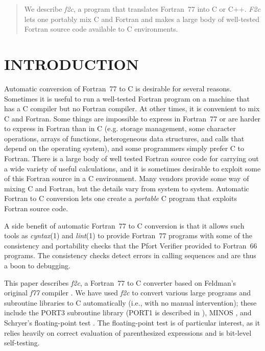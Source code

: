 \documentclass[10pt,a4paper]{article}
\begin{document}
\begin{abstract}
\noindent
We describe \emph{f2c}, a program that translates Fortran~77 into C or C++. \emph{F2c} lets one portably mix C and Fortran and makes a large body of well-tested Fortran source code available to C environments.
\end{abstract}

\nocite{1,2,3,4,5,6,7,8,9,10,11,12,13,14,15}

\section{INTRODUCTION}

Automatic conversion of Fortran~77 \citep{1} to C \citep{10, 11} is desirable for several reasons. Sometimes it is useful to run a well-tested Fortran program on a machine that has a C compiler but no Fortran compiler. At other times, it is convenient to mix C and Fortran. Some things are impossible to express in Fortran~77 or are harder to express in Fortran than in C (e.g. storage management, some character operations, arrays of functions, heterogeneous data structures, and calls that depend on the operating system), and some programmers simply prefer C to Fortran. There is a large body of well tested Fortran source code for carrying out a wide variety of useful calculations, and it is sometimes desirable to exploit some of this Fortran source in a C environment. Many vendors provide some way of mixing C and Fortran, but the details vary from system to system. Automatic Fortran to C conversion lets one create a \emph{portable} C program that exploits Fortran source code.

A side benefit of automatic Fortran~77 to C conversion is that it allows such tools as \emph{cyntax}(1) and \emph{lint}(1) \citep{4} to provide Fortran~77 programs with some of the consistency and portability checks that the Pfort Verifier \citep{13} provided to Fortran~66 programs. The consistency checks detect errors in calling sequences and are thus a boon to debugging.

This paper describes \emph{f2c}, a Fortran~77 to C converter based on Feldman’s original \emph{f77} compiler \citep{6}. We have used \emph{f2c} to convert various large programs and subroutine libraries to C automatically (i.e., with no manual intervention); these include the PORT3 subroutine library (PORT1 is described in \citep{7, 8}), MINOS \citep{12}, and Schryer’s floating-point test \citep{14}. The floating-point test is of particular interest, as it relies heavily on correct evaluation of parenthesized expressions and is bit-level self-testing.
\end{document}
